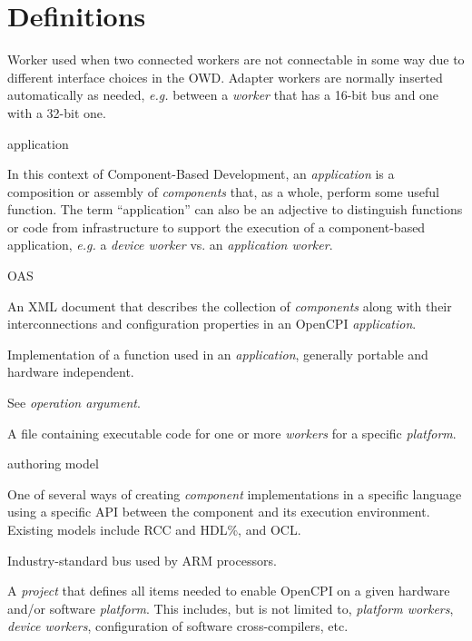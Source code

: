 \documentclass[10pt, a4paper, oneside]{article}
\renewcommand\_{\textunderscore\allowbreak} %
\begin{document}
\newpage
\section{Definitions}
\begin{description}[style=nextline]
\item[Adapter Worker]
Worker used when two connected workers are not connectable in some way due to different interface choices in the OWD.  Adapter workers are normally inserted automatically as needed, \textit{e.g.} between a \textit{worker} that has a 16-bit bus and one with a 32-bit one.

\item[Application]\hypertarget{application}{application}
In this context of Component-Based Development, an \textit{application} is a composition or assembly of \textit{components} that, as a whole, perform some useful function. The term ``application'' can also be an adjective to distinguish functions or code from infrastructure to support the execution of a component-based application, \textit{e.g.} a \textit{device worker} vs. an \textit{application worker}.

\item[Application Specification (OAS)]\hypertarget{OAS}{OAS}
An XML document that describes the collection of \textit{components} along with their interconnections and configuration properties in an OpenCPI \textit{application}.

\item[Application Worker]
Implementation of a function used in an \textit{application}, generally portable and hardware independent.

\item[Argument]
See \textit{operation argument}.

\item[Artifact]
A file containing executable code for one or more \textit{workers}  for a specific \textit{platform}.

\item[\emph{Authoring Model}] \hypertarget{authoring model}{authoring model}
One of several ways of creating \textit{component} implementations in a specific language using a specific API between the component and its execution environment.  Existing models include RCC and HDL\%, and OCL.

\item[AXI (Advanced eXtensible Interface)]
Industry-standard bus used by ARM processors.

\item[Board Support Package]
A \textit{project} that defines all items needed to enable OpenCPI on a given hardware and/or software \textit{platform}. This includes, but is not limited to, \textit{platform workers}, \textit{device workers}, configuration of software cross-compilers, etc.


\end{description}
\end{document}
